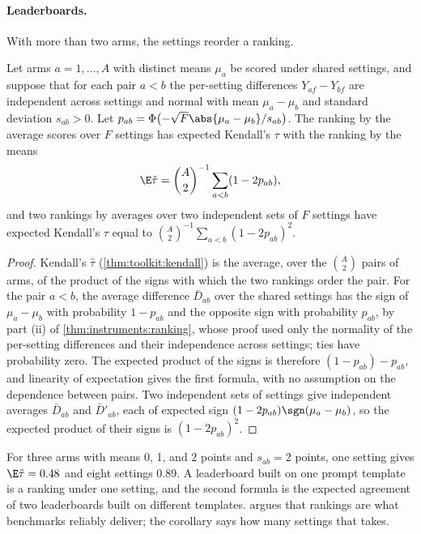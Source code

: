 \begin{refsection}
\paragraph{Leaderboards.} With more than two arms, the settings reorder a ranking.

\begin{corollary}\label{cor:instruments:tau}
Let arms $a=1,\dots,A$ with distinct means $\mu_a$ be scored under shared settings, and suppose that for each pair $a<b$ the per-setting differences $Y_{af}-Y_{bf}$ are independent across settings and normal with mean $\mu_a-\mu_b$ and standard deviation $s_{ab}>0$. Let $p_{ab}=\Phi\bigl(-\sqrt F\abs{\mu_a-\mu_b}/s_{ab}\bigr)$. The ranking by the average scores over $F$ settings has expected Kendall's $\tau$ with the ranking by the means
\[
\E\hat\tau=\binom A2^{-1}\sum_{a<b}(1-2p_{ab}),
\]
and two rankings by averages over two independent sets of $F$ settings have expected Kendall's $\tau$ equal to $\binom A2^{-1}\sum_{a<b}(1-2p_{ab})^2$.
\end{corollary}

\begin{proof}
Kendall's $\hat\tau$ (\cref{thm:toolkit:kendall}) is the average, over the $\binom A2$ pairs of arms, of the product of the signs with which the two rankings order the pair. For the pair $a<b$, the average difference $\bar D_{ab}$ over the shared settings has the sign of $\mu_a-\mu_b$ with probability $1-p_{ab}$ and the opposite sign with probability $p_{ab}$, by part (ii) of \cref{thm:instruments:ranking}, whose proof used only the normality of the per-setting differences and their independence across settings; ties have probability zero. The expected product of the signs is therefore $(1-p_{ab})-p_{ab}$, and linearity of expectation gives the first formula, with no assumption on the dependence between pairs. Two independent sets of settings give independent averages $\bar D_{ab}$ and $\bar D'_{ab}$, each of expected sign $(1-2p_{ab})\sgn(\mu_a-\mu_b)$, so the expected product of their signs is $(1-2p_{ab})^2$.
\end{proof}

For three arms with means 0, 1, and 2 points and $s_{ab}=2$ points, one setting gives $\E\hat\tau=0.48$ and eight settings 0.89. A leaderboard built on one prompt template is a ranking under one setting, and the second formula is the expected agreement of two leaderboards built on different templates. \Textcite{Hardt2026} argues that rankings are what benchmarks reliably deliver; the corollary says how many settings that takes.


\end{refsection}
